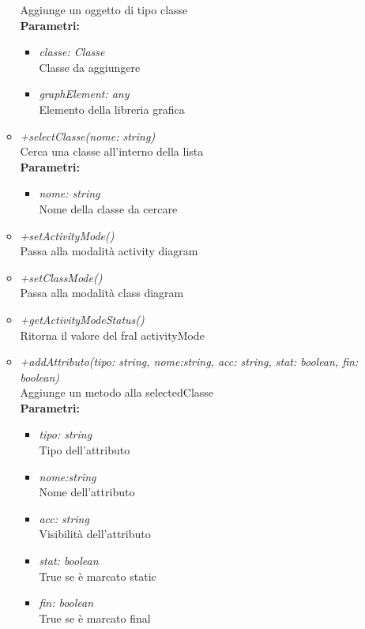 \begin{itemize}
\begin{itemize}
    		Aggiunge un oggetto di tipo classe\\
    		\textbf{Parametri:}
    		\begin{itemize}
    			\item \emph{classe: Classe}\\
    			Classe da aggiungere
    			\item \emph{graphElement: any}\\
    			Elemento della libreria grafica
    		\end{itemize}
    		\item \emph{+selectClasse(nome: string)}\\
    		Cerca una classe all'interno della lista\\
    		\textbf{Parametri:}
    		\begin{itemize}
    			\item \emph{nome: string}\\
    			Nome della classe da cercare
    		\end{itemize}
    		\item \emph{+setActivityMode()}\\
    		Passa alla modalità activity diagram
    		\item \emph{+setClassMode()}\\
    		Passa alla modalità class diagram
    		\item \emph{+getActivityModeStatus()}\\
    		Ritorna il valore del fral activityMode
    		\item \emph{+addAttributo(tipo: string, nome:string, acc: string, stat: boolean, fin: boolean)}\\
    		Aggiunge un metodo alla selectedClasse\\
    		\textbf{Parametri:}
    		\begin{itemize}
    			\item \emph{tipo: string}\\
    			Tipo dell'attributo
    			\item \emph{nome:string}\\
    			Nome dell'attributo
    			\item \emph{acc: string}\\
    			Visibilità dell'attributo
    			\item \emph{stat: boolean}\\
    			True se è marcato static
    			\item \emph{fin: boolean}\\
    			True se è marcato final

\end{itemize}
\end{itemize}
\end{itemize}
